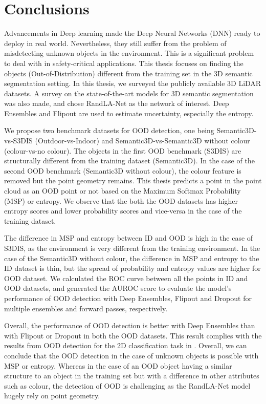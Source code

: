 

    \chapter{Conclusions}
    Advancements in Deep learning made the Deep Neural Networks (DNN) ready to deploy in real world.
    Nevertheless, they still suffer from the problem of misdetecting unknown objects in the environment.
    This is a significant problem to deal with in safety-critical applications.
    This thesis focuses on finding the objects (Out-of-Distribution) different from the training set in the 3D semantic segmentation setting.
    In this thesis, we surveyed the publicly available 3D LiDAR datasets.
    A survey on the state-of-the-art models for 3D semantic segmentation was also made, and chose RandLA-Net as the network of interest.
    Deep Ensembles and Flipout are used to estimate uncertainty, especially the entropy. 
    
    We propose two benchmark datasets for OOD detection, one being Semantic3D-vs-S3DIS (Outdoor-vs-Indoor) and Semantic3D-vs-Semantic3D without colour (colour-vs-no colour).
    The objects in the first OOD benchmark (S3DIS) are structurally different from the training dataset (Semantic3D).
    In the case of the second OOD benchmark (Semantic3D without colour), the colour feature is removed but the point geometry remains.
    This thesis predicts a point in the point cloud as an OOD point or not based on the Maximum Softmax Probability (MSP) or entropy.
    We observe that the both the OOD datasets has higher entropy scores and lower probability scores and vice-versa in the case of the training dataset.
    
    The difference in MSP and entropy between ID and OOD is high in the case of S3DIS, as the environment is very different from the training environment.
    In the case of the Semantic3D without colour, the difference in MSP and entropy to the ID dataset is thin, but the spread of probability and entropy values are higher for OOD dataset.
    We calculated the ROC curve between all the points in ID and OOD datasets, and generated the AUROC score to evaluate the model's performance of OOD detection with Deep Ensembles, Flipout and Dropout for multiple ensembles and forward passes, respectively.
    
    Overall, the performance of OOD detection is better with Deep Ensembles than with Flipout or Dropout in both the OOD datasets.
    This result complies with the results from OOD detection for the 2D classification task in \cite{lakshminarayanan2016simple}.
    Overall, we can conclude that the OOD detection in the case of unknown objects is possible with MSP or entropy.
    Whereas in the case of an OOD object having a similar structure to an object in the training set but with a difference in other attributes such as colour, the detection of OOD is challenging as the RandLA-Net model hugely rely on point geometry.
    
